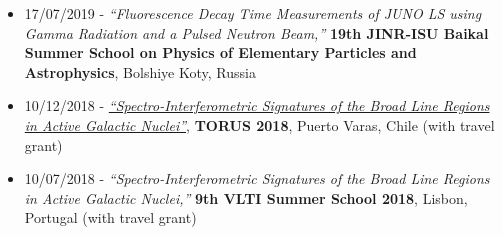 \documentclass[letterpaper,12pt, oneside]{article}
\begin{document}
\begin{itemize}
\item 17/07/2019 - \textit{“Fluorescence Decay Time Measurements of JUNO LS using Gamma Radiation and a Pulsed Neutron Beam,”} \textbf{19th JINR-ISU Baikal Summer School on Physics of Elementary Particles and Astrophysics}, Bolshiye Koty, Russia

\item 10/12/2018 - \href{https://www.torus2018.org/TALKS/18.12.10-S3.3-Stock.pdf}{\textit{“Spectro-Interferometric Signatures of the Broad Line Regions in Active Galactic Nuclei”}}, \textbf{TORUS 2018},
Puerto Varas, Chile (with travel grant)
\item 10/07/2018 - \textit{“Spectro-Interferometric Signatures of the Broad Line Regions in Active Galactic Nuclei,”} \textbf{9th VLTI Summer School 2018}, Lisbon, Portugal (with travel grant)
\end{itemize}
\vspace{1.em}\par
\end{document}
